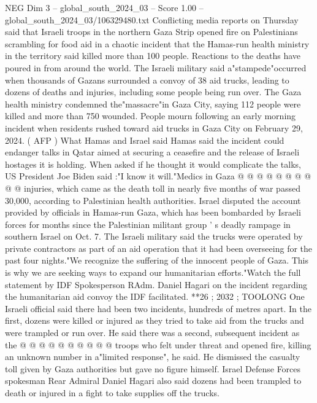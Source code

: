 \begin{textsample}{NEG Dim 3 – global\_south\_2024\_03 – Score 1.00 – global\_south\_2024\_03/106329480.txt}  \label{ex:f3_neg_032}
Conflicting media reports on Thursday said that Israeli troops in the northern Gaza Strip opened fire on Palestinians scrambling for food aid in a chaotic incident that the Hamas-run health ministry in the territory said killed more than 100 people.
Reactions to the deaths have poured in from around the world.
The Israeli military said a"stampede"occurred when thousands of Gazans surrounded a convoy of 38 aid trucks, leading to dozens of deaths and injuries, including some people being run over.
The Gaza health ministry condemned the"massacre"in Gaza City, saying 112 people were killed and more than 750 wounded.
People mourn following an early morning incident when residents rushed toward aid trucks in Gaza City on February 29, 2024. ( AFP ) What Hamas and Israel said Hamas said the incident could endanger talks in Qatar aimed at securing a ceasefire and the release of Israeli hostages it is holding.
When asked if he thought it would complicate the talks, US President Joe Biden said :"I know it will."Medics in Gaza @ @ @ @ @ @ @ @ @ @ injuries, which came as the death toll in nearly five months of war passed 30,000, according to Palestinian health authorities.
Israel disputed the account provided by officials in Hamas-run Gaza, which has been bombarded by Israeli forces for months since the Palestinian militant group ' s deadly rampage in southern Israel on Oct. 7.
The Israeli military said the trucks were operated by private contractors as part of an aid operation that it had been overseeing for the past four nights."We recognize the suffering of the innocent people of Gaza.
This is why we are seeking ways to expand our humanitarian efforts."Watch the full statement by IDF Spokesperson RAdm.
Daniel Hagari on the incident regarding the humanitarian aid convoy the IDF facilitated. **26 ; 2032 ; TOOLONG One Israeli official said there had been two incidents, hundreds of metres apart.
In the first, dozens were killed or injured as they tried to take aid from the trucks and were trampled or run over.
He said there was a second, subsequent incident as the @ @ @ @ @ @ @ @ @ @ troops who felt under threat and opened fire, killing an unknown number in a"limited response", he said.
He dismissed the casualty toll given by Gaza authorities but gave no figure himself.
Israel Defense Forces spokesman Rear Admiral Daniel Hagari also said dozens had been trampled to death or injured in a fight to take supplies off the trucks.

\end{textsample}
